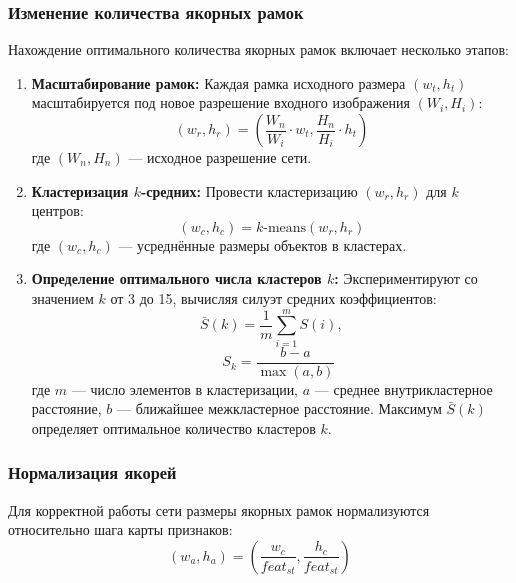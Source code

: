 \documentclass[a4paper,12pt]{article}
\begin{document}
\subsubsection*{Изменение количества якорных рамок}
Нахождение оптимального количества якорных рамок включает несколько этапов:

\begin{enumerate}
    \item \textbf{Масштабирование рамок:}  
    Каждая рамка исходного размера $(w_t, h_t)$ масштабируется под новое разрешение входного изображения $(W_i, H_i)$:
    \begin{equation}
    (w_r, h_r) = \left( \frac{W_n}{W_i} \cdot w_t, \frac{H_n}{H_i} \cdot h_t \right)
    \end{equation}
    где $(W_n, H_n)$ — исходное разрешение сети.
    
    \item \textbf{Кластеризация $k$-средних:}  
    Провести кластеризацию $(w_r, h_r)$ для $k$ центров:
    \begin{equation}
    (w_c, h_c) = k\text{-means}(w_r, h_r)
    \end{equation}
    где $(w_c, h_c)$ — усреднённые размеры объектов в кластерах.
    
    \item \textbf{Определение оптимального числа кластеров $k$:}  
    Экспериментируют со значением $k$ от 3 до 15, вычисляя силуэт средних коэффициентов:
    \begin{equation}
    \bar{S}(k) = \frac{1}{m} \sum_{i=1}^{m} S(i), 
    \end{equation}
    \begin{equation}
    \quad S_k = \frac{b - a}{\max(a,b)} \tag{8,9}
    \end{equation}
    где $m$ — число элементов в кластеризации, $a$ — среднее внутрикластерное расстояние, $b$ — ближайшее межкластерное расстояние.  
    Максимум $\bar{S}(k)$ определяет оптимальное количество кластеров $k$.
\end{enumerate}

\subsubsection*{Нормализация якорей}
Для корректной работы сети размеры якорных рамок нормализуются относительно шага карты признаков:
\begin{equation}
(w_a, h_a) = \left( \frac{w_c}{feat_{st}}, \frac{h_c}{feat_{st}} \right)
\end{equation}
\end{document}
